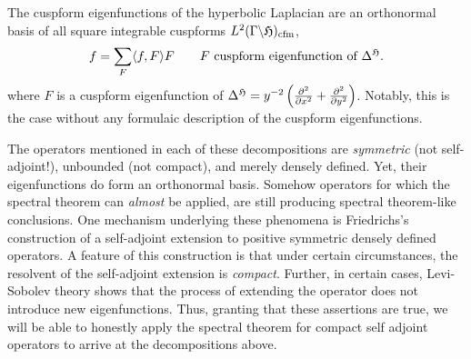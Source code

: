 \documentclass[12pt]{amsart}
\begin{document}
The cuspform eigenfunctions of the hyperbolic Laplacian are an orthonormal basis of all square integrable cuspforms $L^2(\Gamma \backslash \mathfrak{H})_{\text{cfm}}$,
	\begin{align*}
		f=\sum_{F}\langle f, F \rangle F \qquad F\text{ cuspform eigenfunction of }\Delta^{\mathfrak{H}}.
	\end{align*}
where $F$ is a cuspform eigenfunction of $\Delta^{\mathfrak{H}}=y^{-2}\left(\frac{\partial^2}{\partial x^2}+\frac{\partial^2}{\partial y^2}\right)$. Notably, this is the case without any formulaic description of the cuspform eigenfunctions.


The operators mentioned in each of these decompositions are \emph{symmetric} (not self-adjoint!), unbounded (not compact), and merely densely defined. Yet, their eigenfunctions do form an orthonormal basis. Somehow operators for which the spectral theorem can \emph{almost} be applied, are still producing spectral theorem-like conclusions. One mechanism underlying these phenomena is Friedrichs's construction of a self-adjoint extension to positive symmetric densely defined operators. A feature of this construction is that under certain circumstances, the resolvent of the self-adjoint extension is \emph{compact}. Further, in certain cases, Levi-Sobolev theory shows that the process of extending the operator does not introduce new eigenfunctions. Thus, granting that these assertions are true, we will be able to honestly apply the spectral theorem for compact self adjoint operators to arrive at the decompositions above.
\end{document}

